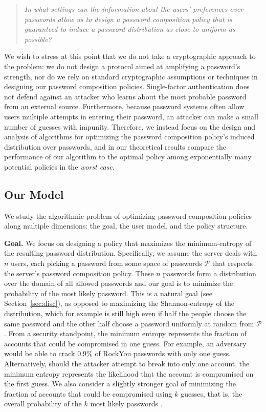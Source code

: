 \documentclass[prodmode,acmec]{ec-acmsmall}
\newcommand{\PasswordSpace}{\mathcal{P}}
\begin{document}
{\begin{quote}
\emph{In what settings can the information about the users' preferences over passwords allow us to design a password composition policy that is \emph{guaranteed} to induce a password distribution as close to uniform as possible?}
\end{quote}

We wish to stress at this point that we do not take a cryptographic approach to the problem: we do not design a protocol aimed at amplifying a password's strength, nor do we rely on standard cryptographic assumptions or techniques in designing our password composition policies. Single-factor authentication does not defend against an attacker who learns about the most probable password from an external source. Furthermore, because password systems often allow users multiple attempts in entering their password, an attacker can make a small number of guesses with impunity. Therefore, we instead focus on the design and analysis of algorithms for optimizing the password composition policy's induced distribution over passwords, and in our theoretical results compare the performance of our algorithm to the optimal policy among exponentially many potential policies in the \emph{worst case}. 


\subsection{Our Model}

We study the algorithmic problem of optimizing password composition policies along multiple dimensions: the goal, the user model, and the policy structure.


\smallskip
\noindent\textbf{Goal.} We focus on designing a policy that maximizes the minimum-entropy of the resulting password distribution. Specifically, we assume the server deals with $n$ users, each picking a password from some space of passwords $\PasswordSpace$ that respects the server's password composition policy. These $n$ passwords form a distribution over the domain of all allowed passwords and our goal is to minimize the probability of the most likely password. This is a natural goal (see Section~\ref{sec:disc}), as opposed to maximizing the Shannon-entropy of the distribution, which for example is still high even if half the people choose the same password and the other half choose a password uniformly at random from $\PasswordSpace$. From a security standpoint, the minimum entropy represents the fraction of accounts that could be compromised in one guess. For example, an adversary would be able to crack $0.9\%$ of RockYou passwords \cite{rockYouPasswords} with only one guess. 
Alternatively, should the attacker attempt to break into only one account, the minimum entropy represents the likelihood that the account is compromised on the first guess.
We also consider a slightly stronger goal of minimizing the fraction of accounts that could be compromised using $k$ guesses, that is, the overall probability of the $k$ most likely passwords \cite{boztas1999entropies}.

}
\end{document}

